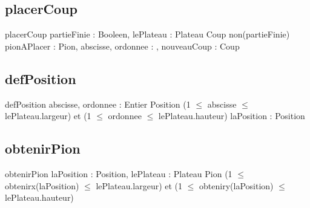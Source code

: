      
     
     \subsection{placerCoup}
     \begin{algorithme}
     	\fonctionAvecPreconditions
     	{placerCoup}
     	{partieFinie : Booleen, lePlateau : Plateau}
     	{Coup}
     	{non(partieFinie)}
     	{pionAPlacer : Pion, abscisse, ordonnee : \naturel, nouveauCoup : Coup}
     	{
     		
     		
     		{	
     		}
     		
     	}
     \end{algorithme}
     
    
     \subsection{defPosition}
     \begin{algorithme}
     	\fonctionAvecPreconditions
     	{defPosition}
     	{abscisse, ordonnee : Entier} 
     	{Position}
     	{(1 $\leqslant$ abscisse $\leqslant$ lePlateau.largeur) et (1 $\leqslant$ ordonnee $\leqslant$  lePlateau.hauteur)}
     	{laPosition : Position}
     	{
     	}	
     \end{algorithme}
     
     \subsection{obtenirPion}
     \begin{algorithme}
     	\fonctionAvecPreconditions
     	{obtenirPion}
     	{laPosition : Position, lePlateau : Plateau} 
     	{Pion}
     	{(1 $\leqslant$ obtenirx(laPosition) $\leqslant$ lePlateau.largeur) et (1 $\leqslant$ obteniry(laPosition) $\leqslant$  lePlateau.hauteur)}
     	{}
     	{
     	}	
     \end{algorithme}




